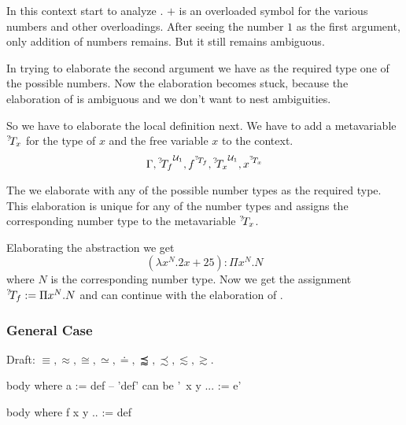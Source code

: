In this context start to analyze . $+$ is an overloaded symbol
for the various numbers and other overloadings. After seeing the number $1$ as
the first argument, only addition of numbers remains. But it still remains
ambiguous.

In trying to elaborate the second argument  we have as the required
type one of the possible numbers. Now the elaboration becomes stuck, because the
elaboration of  is ambiguous and we don't want to nest ambiguities.

So we have to elaborate the local definition next. We have to add a metavariable
${}^?\!T_x$ for the type of $x$ and the free variable $x$ to the context.
$$
    \Gamma, {{}^?\!T_f}^{{\cal{U}}_1}, f^{{}^?\!T_f}, {{}^?\!T_x}^{{\cal{U}}_1}, x^{{}^?\!T_x}
$$

The we elaborate  with any of the possible number types as the
required type. This elaboration is unique for any of the number types and
assigns the corresponding number type to the metavariable ${}^?\!T_x$.

Elaborating the abstraction we get
$$
    (\lambda x^N. 2x + 25): \Pi x^N. N
$$
where $N$ is the corresponding number type. Now we get the assignment ${}^?\!T_f
:= \Pi x^N. N$ and can continue with the elaboration of .


\vskip 5mm
\subsubsection{General Case}

Draft: $\equiv, \approx, \cong, \simeq, \doteq, \precapprox, \precsim, \lesssim,
\gtrsim$.



\begin{alba}
    body
    where
        a := def   -- 'def' can be '\ x y ... := e'

    body
    where
        f x y .. := def
\end{alba}
